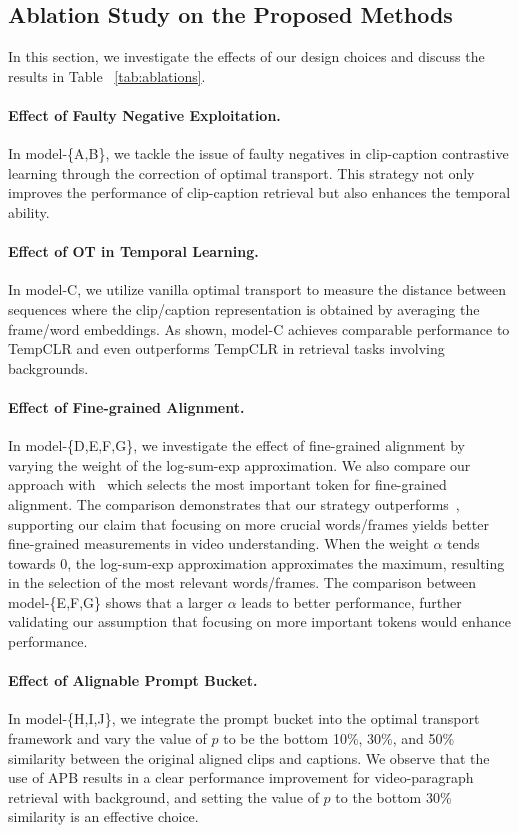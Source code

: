 \subsection{Ablation Study on the Proposed Methods}

In this section, we investigate the effects of our design choices and discuss the results in Table~ \ref{tab:ablations}.

\paragraph{Effect of Faulty Negative Exploitation.} 
In model-\{A,B\}, we tackle the issue of faulty negatives in clip-caption contrastive learning through the correction of optimal transport. This strategy not only improves the performance of clip-caption retrieval but also enhances the temporal ability.

\paragraph{Effect of OT in Temporal Learning.} 
In model-C, we utilize vanilla optimal transport to measure the distance between sequences where the clip/caption representation is obtained by averaging the frame/word embeddings. As shown, model-C achieves comparable performance to TempCLR and even outperforms TempCLR in retrieval tasks involving backgrounds.

\paragraph{Effect of Fine-grained Alignment.} In model-\{D,E,F,G\}, we investigate the effect of fine-grained alignment by varying the weight of the log-sum-exp approximation. We also compare our approach with~\cite{yao2021filip} which selects the most important token for fine-grained alignment. The comparison demonstrates that our strategy outperforms~\cite{yao2021filip}, supporting our claim that focusing on more crucial words/frames yields better fine-grained measurements in video understanding. When the weight $\alpha$ tends towards 0, the log-sum-exp approximation approximates the maximum, resulting in the selection of the most relevant words/frames. The comparison between model-\{E,F,G\} shows that a larger $\alpha$ leads to better performance, further validating our assumption that focusing on more important tokens would enhance performance.

\paragraph{Effect of Alignable Prompt Bucket.} In model-\{H,I,J\}, we integrate the prompt bucket into the optimal transport framework and vary the value of $p$ to be the bottom 10\%, 30\%, and 50\% similarity between the original aligned clips and captions. We observe that the use of APB results in a clear performance improvement for video-paragraph retrieval with background, and setting the value of $p$ to the bottom 30\% similarity is an effective choice.

